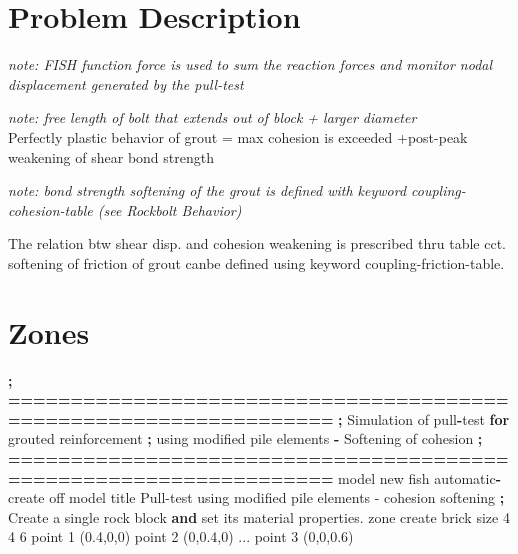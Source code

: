 \documentclass[a4paper, nobind]{templates/ociamthesis}
\newenvironment{Shaded}{\begin{snugshade}}{\end{snugshade}}
\newcommand{\BuiltInTok}[1]{#1}
\newcommand{\ControlFlowTok}[1]{\textcolor[rgb]{0.13,0.29,0.53}{\textbf{#1}}}
\newcommand{\DecValTok}[1]{\textcolor[rgb]{0.00,0.00,0.81}{#1}}
\newcommand{\FloatTok}[1]{\textcolor[rgb]{0.00,0.00,0.81}{#1}}
\newcommand{\KeywordTok}[1]{\textcolor[rgb]{0.13,0.29,0.53}{\textbf{#1}}}
\newcommand{\NormalTok}[1]{#1}
\newcommand{\OperatorTok}[1]{\textcolor[rgb]{0.81,0.36,0.00}{\textbf{#1}}}
\newcommand{\StringTok}[1]{\textcolor[rgb]{0.31,0.60,0.02}{#1}}
\renewenvironment{Shaded}
{
  \vspace{10pt}%
  \begin{snugshade}%
}{%
  \end{snugshade}%
  \vspace{8pt}%
}
\begin{document}
\hypertarget{problem-description-1}{%
\section{Problem Description}\label{problem-description-1}}

\emph{note: FISH function force is used to sum the reaction forces and
monitor nodal displacement generated by the pull-test}

\hfill\break
\emph{note: free length of bolt that extends out of block + larger diameter}\\
Perfectly plastic behavior of grout = max cohesion is exceeded
+post-peak weakening of shear bond strength

\hfill\break
\emph{note: bond strength softening of the grout is defined with keyword
coupling-cohesion-table (see Rockbolt Behavior)}

\hfill\break
The relation btw shear disp. and cohesion weakening is prescribed thru
table cct. softening of friction of grout canbe defined using keyword
coupling-friction-table.\\

\hypertarget{zones-2}{%
\section{Zones}\label{zones-2}}

\begin{Shaded}
\begin{Highlighting}[]
\OperatorTok{;} \OperatorTok{==================================================================}
\OperatorTok{;}\NormalTok{   Simulation of pull}\OperatorTok{{-}}\NormalTok{test }\ControlFlowTok{for}\NormalTok{ grouted reinforcement}
\OperatorTok{;}\NormalTok{   using modified pile elements }\OperatorTok{{-}}\NormalTok{ Softening of cohesion}
\OperatorTok{;} \OperatorTok{==================================================================}
\NormalTok{model new }
\NormalTok{fish automatic}\OperatorTok{{-}}\NormalTok{create off}
\NormalTok{model title }\StringTok{\textquotesingle{}Pull{-}test using modified pile elements {-} cohesion softening\textquotesingle{}}
\OperatorTok{;}\NormalTok{ Create a single rock block }\KeywordTok{and} \BuiltInTok{set}\NormalTok{ its material properties.}
\NormalTok{zone create brick size }\DecValTok{4} \DecValTok{4} \DecValTok{6}\NormalTok{ point }\DecValTok{1}\NormalTok{ (}\FloatTok{0.4}\NormalTok{,}\DecValTok{0}\NormalTok{,}\DecValTok{0}\NormalTok{) point }\DecValTok{2}\NormalTok{ (}\DecValTok{0}\NormalTok{,}\FloatTok{0.4}\NormalTok{,}\DecValTok{0}\NormalTok{) ...}
\NormalTok{                             point }\DecValTok{3}\NormalTok{ (}\DecValTok{0}\NormalTok{,}\DecValTok{0}\NormalTok{,}\FloatTok{0.6}\NormalTok{)}
\end{Highlighting}
\end{Shaded}
\end{document}
